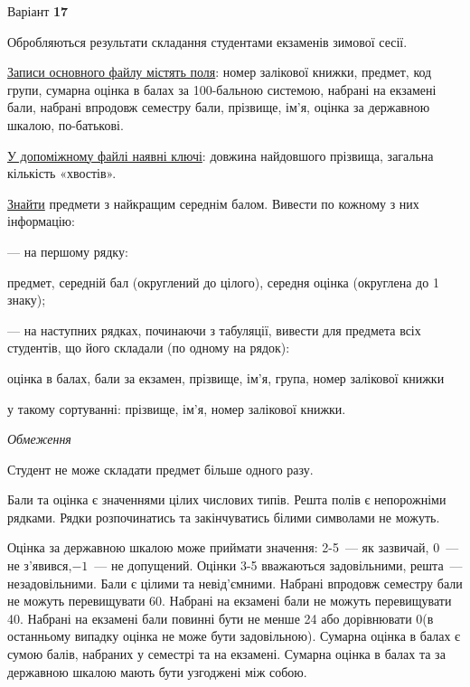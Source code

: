 \documentclass[11pt, ukrainian]{article}
\begin{document}
\par
\newpage

{\center Варіант  \No \textbf { 17 }\par}
\bigskip
Обробляються результати складання студентами екзаменів зимової сесії.

\underline{Записи основного файлу містять поля}: номер залікової книжки, предмет, код групи, сумарна оцінка в балах за 100-бальною системою, набрані на екзамені бали, набрані впродовж семестру бали, прізвище, ім’я, оцінка за державною шкалою, по-батькові.

\underline{У допоміжному файлі наявні ключі}: довжина найдовшого прізвища, загальна кількість «хвостів».

\underline{Знайти} предмети з найкращим середнім балом. Вивести по кожному з них інформацію:\par
{\noindent}--- на першому рядку:\par
предмет, середній бал (округлений до цілого), середня оцінка (округлена до 1 знаку);

{\noindent}--- на наступних рядках, починаючи з табуляції, вивести для предмета всіх студентів, що його складали (по одному на рядок):\par
оцінка в балах, бали за екзамен, прізвище, ім’я, група, номер залікової книжки

{\noindent}у такому сортуванні: прізвище, ім’я, номер залікової книжки.


\bigskip\textit{Обмеження}

Студент не може складати предмет більше одного разу.

Бали та оцінка є значеннями цілих числових типів. Решта полів є непорожніми рядками.
Рядки розпочинатись та закінчуватись білими символами не можуть.

Оцінка за державною шкалою може приймати значення: 2-5~--- як зазвичай, 0~--- не з’явився,$-1$~--- не допущений. 
Оцінки 3-5 вважаються задовільними, решта~--- незадовільними. 
Бали є цілими та невід’ємними.
Набрані впродовж семестру бали не можуть перевищувати 60. 
Набрані на екзамені бали не можуть перевищувати 40. 
Набрані на екзамені бали повинні бути не менше 24 або дорівнювати 0(в останньому випадку оцінка не може бути задовільною). 
Сумарна оцінка в балах є сумою балів, набраних у семестрі та на екзамені.
Сумарна оцінка в балах та за державною шкалою мають бути узгоджені між собою.
\end{document}
